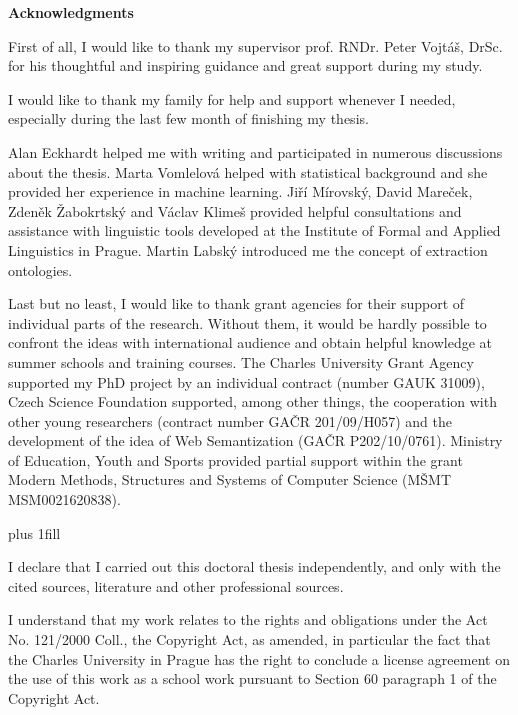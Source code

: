 \documentclass[12pt,a4paper,twoside,openright]{report}
\begin{document}
\newpage


{\Huge\bfseries Acknowledgments 
 \par\nobreak \vskip 20pt
}

\noindent First of all, I would like to thank my supervisor prof. RNDr. Peter Vojt\'{a}\v{s}, DrSc. for his thoughtful and inspiring guidance and great support during my study. 

I would like to thank my family for help and support whenever I needed, especially during the last few month of finishing my thesis.

Alan Eckhardt helped me with writing and participated in numerous discussions about the thesis. Marta Vomlelov\'{a} helped with statistical background and she provided her experience in machine learning. Jiří Mírovský, David Mareček, Zdeněk Žabokrtský and Václav Klimeš provided helpful consultations and assistance with linguistic tools developed at the Institute of Formal and Applied Linguistics in Prague. Martin Labský introduced me the concept of extraction ontologies.

Last but no least, I would like to thank grant agencies for their support of individual parts of the research. Without them, it would be hardly possible to confront the ideas with international audience and obtain helpful knowledge at summer schools and training courses. The Charles University Grant Agency supported my PhD project by an individual contract (number GAUK 31009), Czech Science Foundation supported, among other things, the cooperation with other young researchers (contract number GAČR 201/09/H057) and the development of the idea of Web Semantization (GAČR P202/10/0761). Ministry of Education, Youth and Sports provided partial support within the grant Modern Methods, Structures and Systems of Computer Science (MŠMT MSM0021620838).


\newpage


\vglue 0pt plus 1fill

\noindent
I declare that I carried out this doctoral thesis independently, and only with the cited
sources, literature and other professional sources.

\medskip\noindent
I understand that my work relates to the rights and obligations under the Act No.
121/2000 Coll., the Copyright Act, as amended, in particular the fact that the Charles
University in Prague has the right to conclude a license agreement on the use of this
work as a school work pursuant to Section 60 paragraph 1 of the Copyright Act.
\end{document}
